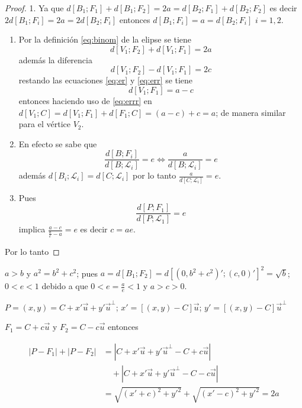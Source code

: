 \documentclass[10pt,]{krantz}
\theoremstyle{definition}
\theoremstyle{definition}
\theoremstyle{definition}
\theoremstyle{remark}
\let\BeginKnitrBlock\begin \let\EndKnitrBlock\end
\begin{document}
\BeginKnitrBlock{proof}
{}
1. Ya que \(d\left[B_1;F_1\right]+d\left[B_1;F_2\right]=2a=d\left[B_2;F_1\right]+d\left[B_2;F_2\right]\) es decir \(2d\left[B_1;F_i\right]=2a=2d\left[B_2;F_i\right]\) entonces \(d\left[B_1;F_i\right]=a=d\left[B_2;F_i\right]\) \(i=1,2\).

\begin{enumerate}
\def\labelenumi{\arabic{enumi}.}
\setcounter{enumi}{1}
\item
  Por la definición \eqref{eq:binom} de la elipse se tiene
  \begin{equation}
  d\left[V_1;F_2\right]+d\left[V_1;F_1\right]=2a
  \label{eq:er}
  \end{equation}
  además la diferencia
  \begin{equation}
  d\left[V_1;F_2\right]-d\left[V_1;F_1\right]=2c
  \label{eq:err}
  \end{equation}
  restando las ecuaciones \eqref{eq:er} y \eqref{eq:err} se tiene
  \begin{equation}
  d\left[V_1;F_1\right]=a-c
  \label{eq:errr}
  \end{equation}
  entonces haciendo uso de \eqref{eq:errr} en \(d\left[V_1;C\right]=d\left[V_1;F_1\right]+d\left[F_1;C\right]=(a-c)+c=a\); de manera similar para el vértice \(V_2\).
\item
  En efecto se sabe que \[\frac{d\left[B;F_i\right]}{d\left[B;\mathcal{L}_i\right]}=e\Longleftrightarrow \frac{a}{d\left[B;\mathcal{L}_i\right]}=e\] además \(d\left[B_i;\mathcal{L}_i\right]=d\left[C;\mathcal{L}_i\right]\) por lo tanto \(\frac{a}{d\left[C;\mathcal{L}_i\right]}=e\).
\item
  Pues \[\frac{d\left[P;F_1\right]}{d\left[P;\mathcal{L}_1\right]}=e\] implica \(\frac{a-c}{\frac{a}{e}-a}=e\) es decir \(c=ae\).
\end{enumerate}

Por lo tanto
\EndKnitrBlock{proof}

\(a>b\) y \(a^2=b^2+c^2\); pues \(a=d\left[B_1;F_2\right]=d\left[(0,b^2+c^2)';(c,0)'\right]^2=\sqrt{b}\); \(0<e<1\) debido a que \(0<e=\frac{a}{e}<1\) y \(a>c>0\).

\(P=(x,y)=C+x'\vec{u}+y'\vec{u}^\perp\); \(x'=[(x,y)-C]\vec{u}\); \(y'=[(x,y)-C]\vec{u}^\perp\)

\(F_1=C+c\vec{u}\) y \(F_2=C-c\vec{u}\) entonces

\begin{align*}
\left|P-F_1\right|+\left|P-F_2\right|&=\left|C+x'\vec{u}+y'\vec{u}^\perp-C+c\vec{u}\right|\\
&\quad+\left|C+x'\vec{u}+y'\vec{u}^\perp-C-c\vec{u}\right|\\
&=\sqrt{(x'+c)^2+y'^2}+\sqrt{(x'-c)^2+y'^2}=2a\end{align*}
\end{document}
